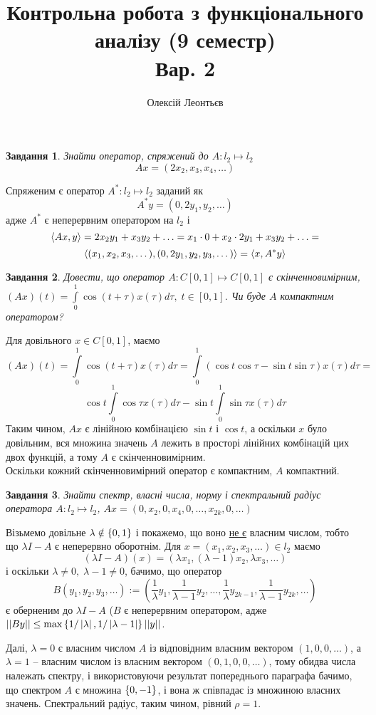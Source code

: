 \documentclass[10pt]{article}
\title{Контрольна робота з функціонального аналізу (9 семестр)\\Вар. 2}
\author{Олексій Леонтьєв}
\newtheorem{prob}{Завдання}
\let\oldint\int
\renewcommand{\int}{\oldint\limits}
\begin{document}
\maketitle
\begin{prob}Знайти оператор, спряжений до $A:l_2\mapsto l_2$\[Ax=({2}x_2,x_3,x_4,\dots)\]\end{prob}
	Спряженим є оператор $A^*:l_2\mapsto l_2$ заданий як
	\[A^*y=(0,2y_1,y_2,\dots)\]
	адже $A^*$ є неперервним оператором на $l_2$ і
	\[\left<Ax,y\right>=2x_2{y_1}+x_3{y_2}+\hdots=
	x_1\cdot 0+x_2\cdot{{2}y_1}+x_3{y_2}+\hdots=\]
	\[\left<(x_1,x_2,x_3,\dots),(0,{2}y_1,y_2,y_3,\dots)\right>=\left<x,A^*y\right>\]
\begin{prob}Довести, що оператор $A:C[0,1]\mapsto C[0,1]$ є скінченновимірним, $(Ax)(t)=\int_0^{1}\cos(t+\tau)x(\tau)d\tau,\;t\in[0,1]$.
	Чи буде $A$ компактним оператором?\end{prob}
	Для довільного $x\in C[0,1]$, маємо
	\[(Ax)(t)=\int_0^{1}\cos(t+\tau)x(\tau)d\tau=\int_0^{1}\left(\cos t\cos\tau-\sin t\sin\tau\right)x(\tau)d\tau=\]
	\[\cos t\int_0^{1}\cos\tau x(\tau)d\tau-\sin t\int_0^{1}\sin\tau x(\tau)d\tau\]
	Таким чином, $Ax$ є лінійною комбінацією $\sin t$ і $\cos t$, а оскільки $x$ було довільним, вся множина значень $A$ лежить в просторі
	лінійних комбінацій цих двох функцій, а тому $A$ є скінченновимірним.\\
	Оскільки кожний скінченновимірний оператор є компактним, $A$ компактний.
	\begin{prob}Знайти спектр, власні числа, норму і спектральний радіус оператора $A:l_2\mapsto l_2$, $Ax=(0,x_2,0,x_4,0,\hdots,x_{2k},0,\hdots)
		$\end{prob}
	Візьмемо довільне $\lambda\notin\left\{0,1\right\}$ і покажемо, що воно \uline{не є} власним числом, тобто що $\lambda I-A$ є неперервно
	оборотнім. Для $x=(x_1,x_2,x_3,\hdots)\in l_2$ маємо
	\[(\lambda I-A)(x)=(\lambda x_1,(\lambda-1)x_2,\lambda x_3,\hdots)\]
	і оскільки $\lambda\neq0,\;\lambda-1\neq0$,
	бачимо, що оператор \[B(y_1,y_2,y_3,\hdots):=(\frac{1}{\lambda}y_1,\frac{1}{\lambda-1}y_2,\hdots,\frac{1}{\lambda}y_{2k-1},\frac{1}{\lambda-1
	}y_{2k},\hdots)\]
	є оберненим до $\lambda I-A$ ($B$ є неперервним оператором, адже 
	$\mynorm{By}\leq\max\mycbra{1/\myabs{\lambda},1/\myabs{\lambda-1}}\mynorm{y}$.

	Далі, $\lambda=0$ є власним числом $A$ із відповідним власним вектором $(1,0,0,\hdots)$, а $\lambda=1$ -- власним числом із власним вектором
	$(0,1,0,0,\hdots)$, тому обидва числа належать спектру, і використовуючи результат попереднього параграфа бачимо, що спектром $A$ є
	множина $\left\{0,-1\right\}$, і вона ж співпадає із множиною власних значень. Спектральний радіус, таким чином, рівний $\rho=1$.
\end{document}
